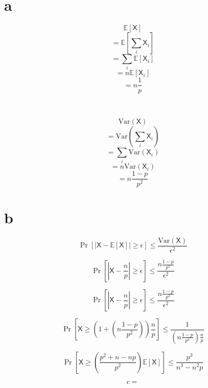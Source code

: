 \documentclass{article}
\newcommand{\E}{\mathbb{E}}
\newcommand{\rX}{\mathsf{X}}
\newcommand{\Var}{\text{Var}}
\begin{document}
\section{a}

$$\E[\rX]$$
$$=\E[\sum_i \rX_i]$$
$$=\sum_i \E[\rX_i]$$
$$= n \E[\rX_i]$$
$$= n \frac{1}{p}$$

\

$$\Var(\rX)$$
$$= \Var(\sum_i \rX_i)$$
$$= \sum_i \Var(\rX_i)$$
$$= n \Var(\rX_i)$$
$$= n \frac{1-p}{p^2}$$

\section{b}

$$\Pr[|\rX - \E[\rX]| \geq \epsilon] \leq \frac{\Var(\rX)}{\epsilon ^2}$$

$$\Pr[|\rX - \frac{n}{p}| \geq \epsilon] \leq \frac{n \frac{1-p}{p^2}}{\epsilon ^2}$$

$$\Pr[|\rX - \frac{n}{p}| \geq \epsilon] \leq \frac{n \frac{1-p}{p^2}}{\epsilon ^2}$$

$$\Pr[\rX \geq (1+(n\frac{1-p}{p^2}))\frac{n}{p}] \leq
\frac{1}{(n\frac{1-p}{p^2})\frac{n}{p}}$$

$$\Pr[\rX \geq (\frac{p^2+n-np}{p^2})\E[\rX]] \leq
\frac{p^3}{n^3-n^2p}$$

$$c = $$
\end{document}
